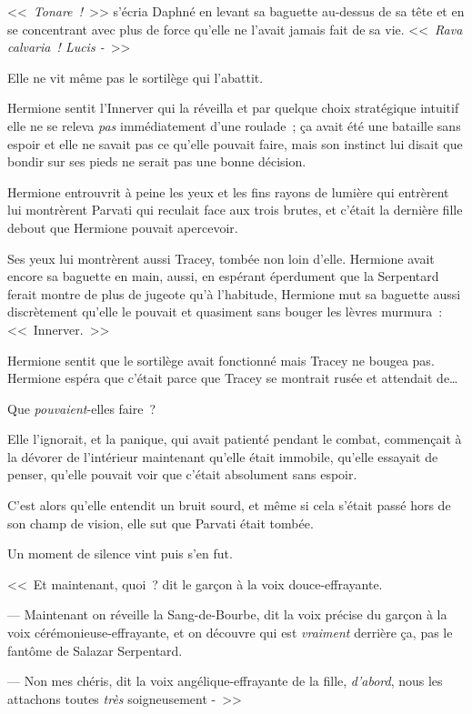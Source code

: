 <<~\emph{Tonare~!}~>> s'écria Daphné en levant sa baguette au-dessus de sa tête et en se concentrant avec plus de force qu'elle ne l'avait jamais fait de sa vie. <<~\emph{Rava calvaria~! Lucis -}~>>

Elle ne vit même pas le sortilège qui l'abattit.

\later

Hermione sentit l'Innerver qui la réveilla et par quelque choix stratégique intuitif elle ne se releva \emph{pas} immédiatement d'une roulade~; ça avait été une bataille sans espoir et elle ne savait pas ce qu'elle pouvait faire, mais son instinct lui disait que bondir sur ses pieds ne serait pas une bonne décision.

Hermione entrouvrit à peine les yeux et les fins rayons de lumière qui entrèrent lui montrèrent Parvati qui reculait face aux trois brutes, et c'était la dernière fille debout que Hermione pouvait apercevoir.

Ses yeux lui montrèrent aussi Tracey, tombée non loin d'elle. Hermione avait encore sa baguette en main, aussi, en espérant éperdument que la Serpentard ferait montre de plus de jugeote qu'à l'habitude, Hermione mut sa baguette aussi discrètement qu'elle le pouvait et quasiment sans bouger les lèvres murmura~: <<~Innerver.~>>

Hermione sentit que le sortilège avait fonctionné mais Tracey ne bougea pas. Hermione espéra que c'était parce que Tracey se montrait rusée et attendait de…

Que \emph{pouvaient}-elles faire~?

Elle l'ignorait, et la panique, qui avait patienté pendant le combat, commençait à la dévorer de l'intérieur maintenant qu'elle était immobile, qu'elle essayait de penser, qu'elle pouvait voir que c'était absolument sans espoir.

C'est alors qu'elle entendit un bruit sourd, et même si cela s'était passé hors de son champ de vision, elle sut que Parvati était tombée.

Un moment de silence vint puis s'en fut.

<<~Et maintenant, quoi~? dit le garçon à la voix douce-effrayante.

--- Maintenant on réveille la Sang-de-Bourbe, dit la voix précise du garçon à la voix cérémonieuse-effrayante, et on découvre qui est \emph{vraiment} derrière ça, pas le fantôme de Salazar Serpentard.

--- Non mes chéris, dit la voix angélique-effrayante de la fille, \emph{d'abord}, nous les attachons toutes \emph{très} soigneusement -~>>

